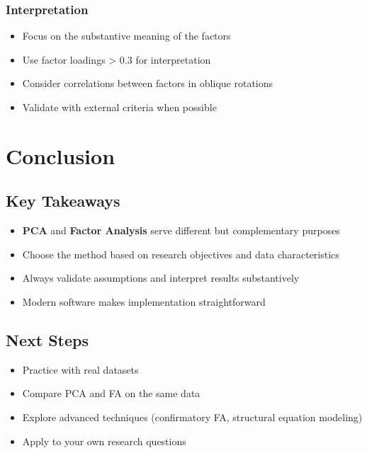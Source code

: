 \documentclass[
]{article}
\begin{document}
\subsubsection{Interpretation}

\begin{itemize}
\item
  Focus on the substantive meaning of the factors
\item
  Use factor loadings \textgreater{} 0.3 for interpretation
\item
  Consider correlations between factors in oblique rotations
\item
  Validate with external criteria when possible
\end{itemize}

\section{Conclusion}

\subsection{Key Takeaways}

\begin{itemize}
\item
  \textbf{PCA} and \textbf{Factor Analysis} serve different but
  complementary purposes
\item
  Choose the method based on research objectives and data
  characteristics
\item
  Always validate assumptions and interpret results substantively
\item
  Modern software makes implementation straightforward
\end{itemize}

\subsection{Next Steps}

\begin{itemize}
\item
  Practice with real datasets
\item
  Compare PCA and FA on the same data
\item
  Explore advanced techniques (confirmatory FA, structural equation
  modeling)
\item
  Apply to your own research questions
\end{itemize}
\end{document}
